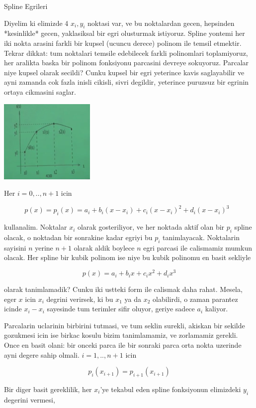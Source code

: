 \documentclass[12pt,fleqn]{article}\usepackage{../common}
\begin{document}
Spline Egrileri

Diyelim ki elimizde 4 $x_i,y_i$ noktasi var, ve bu noktalardan gecen,
hepsinden *kesinlikle* gecen, yaklasiksal bir egri olusturmak
istiyoruz. Spline yontemi her iki nokta arasini farkli bir kupsel (ucuncu
derece) polinom ile temsil etmektir. Tekrar dikkat: tum noktalari temsile
edebilecek farkli polinomlari toplamiyoruz, her aralikta baska bir polinom
fonksiyonu parcasini devreye sokuyoruz. Parcalar niye kupsel olarak
secildi? Cunku kupsel bir egri yeterince kavis saglayabilir ve ayni zamanda
cok fazla inisli cikisli, sivri degildir, yeterince puruzsuz bir egrinin
ortaya cikmasini saglar.

\includegraphics[height=4cm]{spline1.png}



Her $i=0,..,n+1$ icin 

$$ p(x) = p_i(x) = a_i + b_i(x-x_i) + c_i(x-x_i)^2 + d_i(x-x_i)^3
\ \ \ \label{1}
$$

kullanalim. Noktalar $x_i$ olarak gosteriliyor, ve her noktada aktif olan
bir $p_i$ spline olacak, o noktadan bir sonrakine kadar egriyi bu $p_i$
tanimlayacak. Noktalarin sayisini $n$ yerine $n+1$ olarak aldik boylece $n$
egri parcasi ile calismamiz mumkun olacak. Her spline bir kubik polinom ise
niye bu kubik polinomu en basit sekliyle

$$ p(x) = a_i + b_ix + c_ix^2 + d_ix^3 $$

olarak tanimlamadik? Cunku iki ustteki form ile calismak daha
rahat. Mesela, eger $x$ icin $x_i$ degrini verirsek, ki bu $x_1$ ya da
$x_2$ olabilirdi, o zaman parantez icinde $x_i - x_i$ sayesinde tum terimler sifir
oluyor, geriye sadece $a_i$ kaliyor. 

Parcalarin uclarinin birbirini tutmasi, ve tum seklin surekli, akiskan bir
sekilde gozukmesi icin ise birkac kosulu bizim tanimlamamiz, ve zorlamamiz
gerekli. Once en basit olani: bir onceki parca ile bir sonraki parca
orta nokta uzerinde ayni degere sahip olmali. $i=1,..,n+1$ icin

$$ p_i (x_{i+1}) = p_{i+1}(x_{i+1}) $$

Bir diger basit gereklilik, her $x_i$'ye tekabul eden spline fonksiyonun
elimizdeki $y_i$ degerini vermesi,
\end{document}
